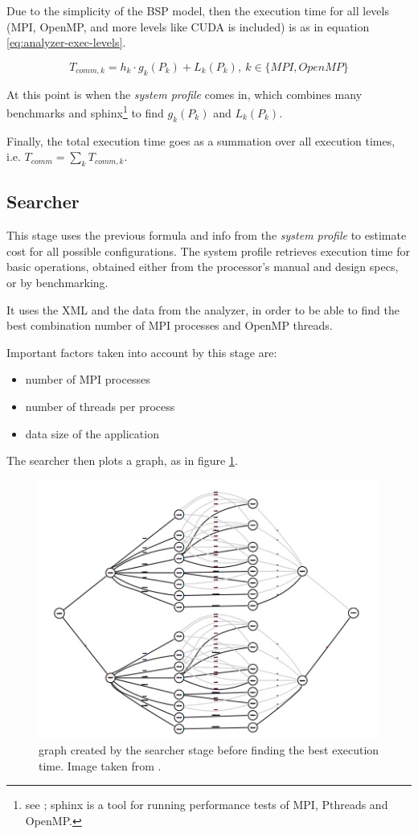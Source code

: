 \documentclass[paper=a4, fontsize=11pt]{scrartcl} %
\numberwithin{equation}{section} %
\numberwithin{figure}{section} %
\numberwithin{table}{section} %
\begin{document}
Due to the simplicity of the BSP model, then the execution time for all levels (MPI, OpenMP, and more levels like CUDA is included) is as in equation \ref{eq:analyzer-exec-levels}.

\begin{equation}
\label{eq:analyzer-exec-levels}
T_{comm,k} = h_{k}\cdot g_{k}(P_{k}) + L_{k}(P_{k}), \ k \in \{ MPI, OpenMP \}
\end{equation}

At this point is when the \textit{system profile} comes in, which combines many benchmarks and sphinx\footnote{see \cite{sphinx}; sphinx is a tool for running performance tests of MPI, Pthreads and OpenMP.} to find $g_{k}(P_{k})$ and $L_{k}(P_{k})$.

Finally, the total execution time goes as a summation over all execution times, i.e. $T_{comm} = \sum_{k}T_{comm,k}$.


\subsection{Searcher}

This stage uses the previous formula and info from the \textit{system profile} to estimate cost for all possible configurations. The system profile retrieves execution time for basic operations, obtained either from the processor's manual and design specs, or by benchmarking.

It uses the XML and the data from the analyzer, in order to be able to find the best combination number of MPI processes and OpenMP threads.

Important factors taken into account by this stage are:

\begin{itemize}
\item number of MPI processes
\item number of threads per process
\item data size of the application
\end{itemize}

The searcher then plots a graph, as in figure \ref{fig:graph-searcher}. 

\begin{figure}
\centering
\includegraphics[width=0.8\linewidth]{searcher-graph.png}
\caption{graph created by the searcher stage before finding the best execution time. Image taken from \cite{hamidouche}.} \label{fig:graph-searcher}
\end{figure}
\end{document}
